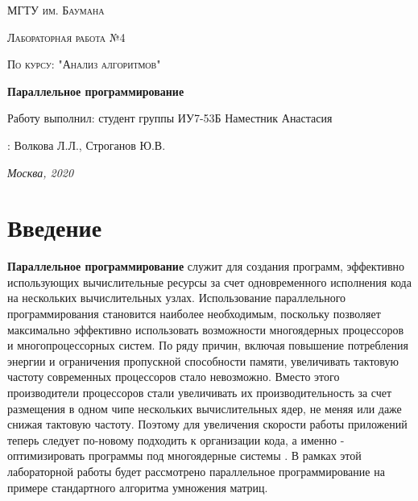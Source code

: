 \documentclass[12pt]{report}
\begin{document}
 
\begin{titlepage}
	\centering
	{\scshape\LARGE МГТУ им. Баумана \par}
	\vspace{3cm}
	{\scshape\Large Лабораторная работа №4\par}
	\vspace{0.5cm}	
	{\scshape\Large По курсу: "Анализ алгоритмов"\par}
	\vspace{1.5cm}
	{\huge\bfseries Параллельное программирование\par}
	\vspace{2cm}
	\Large Работу выполнил: студент группы ИУ7-53Б Наместник Анастасия\par
	\vspace{0.5cm}
	:  Волкова Л.Л., Строганов Ю.В.\par

	\vfill
	\large \textit {Москва, 2020} \par
\end{titlepage}

\tableofcontents

\newpage
\chapter*{Введение}

	\textbf{Параллельное программирование} служит для создания программ, эффективно использующих вычислительные ресурсы за счет одновременного исполнения кода на нескольких вычислительных узлах. Использование параллельного программирования становится наиболее необходимым, поскольку позволяет максимально эффективно использовать возможности многоядерных процессоров и многопроцессорных систем. По ряду причин, включая повышение потребления энергии и ограничения пропускной способности памяти, увеличивать тактовую частоту современных процессоров стало невозможно. Вместо этого производители процессоров стали увеличивать их производительность за счет размещения в одном чипе нескольких вычислительных ядер, не меняя или даже снижая тактовую частоту. Поэтому для увеличения скорости работы приложений теперь следует по-новому подходить к организации кода, а именно - оптимизировать программы под многоядерные системы \cite{MicrosoftPar}.
 В рамках этой лабораторной работы будет рассмотрено параллельное программирование на примере стандартного алгоритма умножения матриц.
\end{document}
